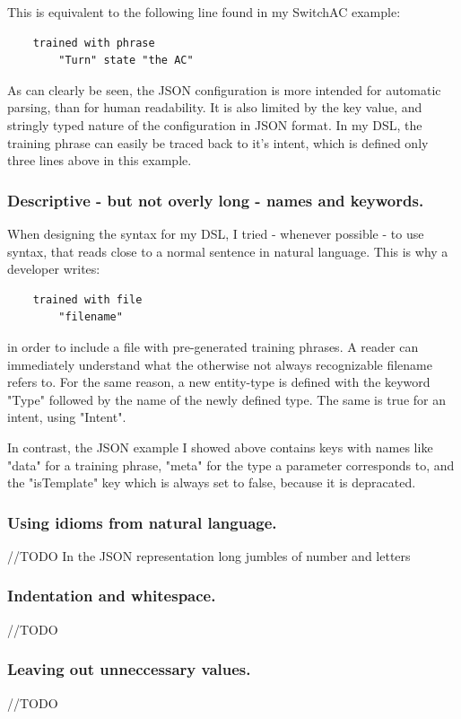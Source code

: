 This is equivalent to the following line found in my SwitchAC example:
\begin{verbatim}
    trained with phrase
        "Turn" state "the AC"
\end{verbatim}
As can clearly be seen, the JSON configuration is more intended for automatic parsing, than for human readability. It is also limited by the key value, and stringly typed nature of the configuration in JSON format. In my DSL, the training phrase can easily be traced back to it's intent, which is defined only three lines above in this example.

\subsubsection{Descriptive - but not overly long - names and keywords.}

When designing the syntax for my DSL, I tried - whenever possible - to use syntax, that reads close to a normal sentence in natural language. This is why a developer writes: 
\begin{verbatim}
    trained with file
        "filename"
\end{verbatim}
in order to include a file with pre-generated training phrases. A reader can immediately understand what the otherwise not always recognizable filename refers to.
For the same reason, a new entity-type is defined with the keyword "Type" followed by the name of the newly defined type. The same is true for an intent, using "Intent".

In contrast, the JSON example I showed above contains keys with names like "data" for a training phrase, "meta" for the type a parameter corresponds to, and the "isTemplate" key which is always set to false, because it is depracated.

\subsubsection{Using idioms from natural language.}
//TODO
In the JSON representation long jumbles of number and letters 

\subsubsection{Indentation and whitespace.}
//TODO

\subsubsection{Leaving out unneccessary values.}
//TODO

